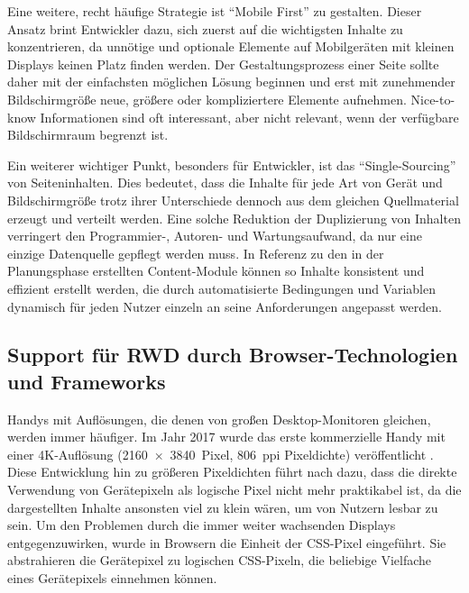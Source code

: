 Eine weitere, recht häufige Strategie ist "`Mobile First"' \autocite{Wroblewski.MobileFirst.2009} zu gestalten.
Dieser Ansatz brint Entwickler dazu, sich zuerst auf die wichtigsten Inhalte zu konzentrieren, da unnötige und optionale Elemente auf Mobilgeräten mit kleinen Displays keinen Platz finden werden.
Der Gestaltungsprozess einer Seite sollte daher mit der einfachsten möglichen Lösung beginnen und erst mit zunehmender Bildschirmgröße neue, größere oder kompliziertere Elemente aufnehmen.
Nice-to-know Informationen sind oft interessant, aber nicht relevant, wenn der verfügbare Bildschirmraum begrenzt ist.

Ein weiterer wichtiger Punkt, besonders für Entwickler, ist das "`Single-Sourcing"' \autocite[S. 3--4]{Katajisto.CreatingSupportContent.2015} von Seiteninhalten.
Dies bedeutet, dass die Inhalte für jede Art von Gerät und Bildschirmgröße trotz ihrer Unterschiede dennoch aus dem gleichen Quellmaterial erzeugt und verteilt werden.
Eine solche Reduktion der Duplizierung von Inhalten verringert den Programmier-, Autoren- und Wartungsaufwand, da nur eine einzige Datenquelle gepflegt werden muss.
In Referenz zu den in der Planungsphase erstellten Content-Module können so Inhalte konsistent und effizient erstellt werden, die durch automatisierte Bedingungen und Variablen dynamisch für jeden Nutzer einzeln an seine Anforderungen angepasst werden.


\subsection{Support für \ac{RWD} durch Browser-Technologien und Frameworks}

Handys mit Auflösungen, die denen von großen Desktop-Monitoren gleichen, werden immer häufiger.
Im Jahr 2017 wurde das erste kommerzielle Handy mit einer 4K-Auflösung (2160 × 3840 Pixel, 806 ppi Pixeldichte) veröffentlicht \autocite{Wikipedia.SonyXperiaZ5Premium.2024}.
Diese Entwicklung hin zu größeren Pixeldichten führt nach \autocite{Harmsen.2018} dazu, dass die direkte Verwendung von Gerätepixeln als logische Pixel nicht mehr praktikabel ist, da die dargestellten Inhalte ansonsten viel zu klein wären, um von Nutzern lesbar zu sein.
Um den Problemen durch die immer weiter wachsenden Displays entgegenzuwirken, wurde in Browsern die Einheit der \acs{CSS}-Pixel eingeführt.
Sie abstrahieren die Gerätepixel zu logischen \acs{CSS}-Pixeln, die beliebige Vielfache eines Gerätepixels einnehmen können.

